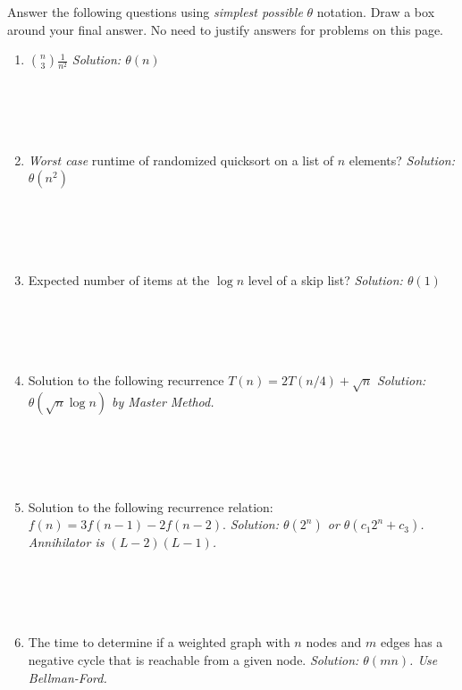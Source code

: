 \documentclass[11pt]{article}
\newcommand{\ans}[1]{\emph{Solution: #1}}
\begin{document}
\begin{enumerate}
 

 
Answer the following questions using \emph{simplest possible} $\theta$ notation.  Draw a box around your final answer.  No need to justify answers for problems on this page.
 
 \begin{enumerate}

\item ${n \choose 3} \frac{1}{n^{2}}$ \ans{$\theta(n)$}  \\ \ \\ \ \\ \ \\ \ \\ 

\item \emph{Worst case} runtime of randomized quicksort on a list of $n$ elements? \ans{$\theta(n^{2})$} \\ \ \\ \ \\ \ \\ \ \\

\item Expected number of items at the $\log n$ level of a skip list? \ans{$\theta(1)$} \\ \ \\ \ \\ \ \\ \ \\

\item Solution to the following recurrence $T(n) = 2T(n/4) + \sqrt{n}$ \ans{$\theta(\sqrt{n} \log n)$ by Master Method.}  \\ \ \\ \ \\ \ \\ \ \\

\item Solution to the following recurrence relation: $f(n) = 3f(n-1) - 2f(n-2)$. \ans{$\theta(2^{n})$ or $\theta(c_{1}2^{n} + c_{3})$.  Annihilator is $(L - 2)(L-1)$.} \\ \ \\ \ \\ \ \\ \ \\ 

\pagebreak

\item The time to determine if a weighted graph with $n$ nodes and $m$ edges has a negative cycle that is reachable from a given node.  \ans{$\theta(mn)$.  Use Bellman-Ford.} \\ \ \\ \ \\ \ \\ \ \\


\end{enumerate}
\end{enumerate}
\end{document}
